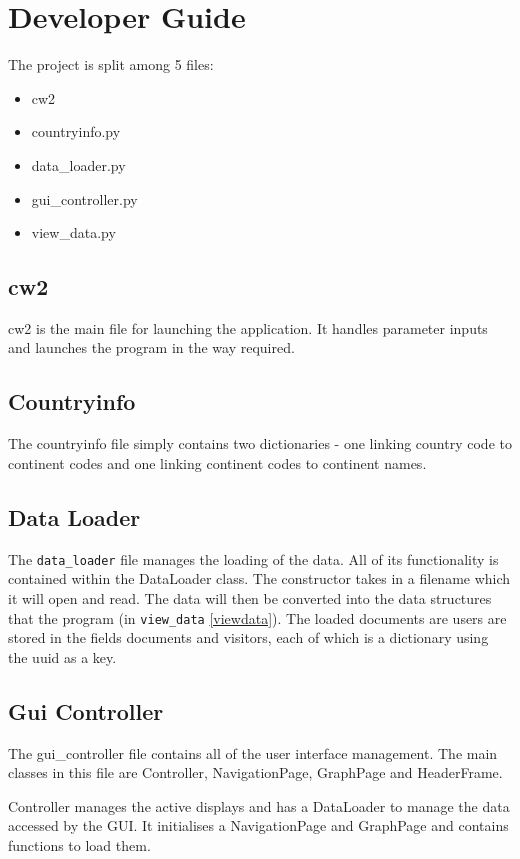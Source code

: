 \documentclass[12pt]{report}
\begin{document}
\chapter{Developer Guide}

The project is split among 5 files:
\begin{itemize}
\item{cw2}
\item{countryinfo.py}
\item{data\_loader.py}
\item{gui\_controller.py}
\item{view\_data.py}
\end{itemize}

\section{cw2}
cw2 is the main file for launching the application.  It handles parameter inputs and launches the program in the way required.

\section{Countryinfo}
The countryinfo file simply contains two dictionaries - one linking country code to continent codes and one linking continent codes to continent names.

\section{Data Loader}
The \lstinline{data_loader} file manages the loading of the data.  All of its functionality is contained within the DataLoader class.  The constructor takes in a filename which it will open and read.  The data will then be converted into the data structures that the program (in \lstinline{view_data} \ref{viewdata}).  The loaded documents are users are stored in the fields documents and visitors, each of which is a dictionary using the uuid as a key.

\section{Gui Controller}
The gui\_controller file contains all of the user interface management.  The main classes in this file are Controller, NavigationPage, GraphPage and HeaderFrame.

Controller manages the active displays and has a DataLoader to manage the data accessed by the GUI.  It initialises a NavigationPage and GraphPage and contains functions to load them.
\end{document}
